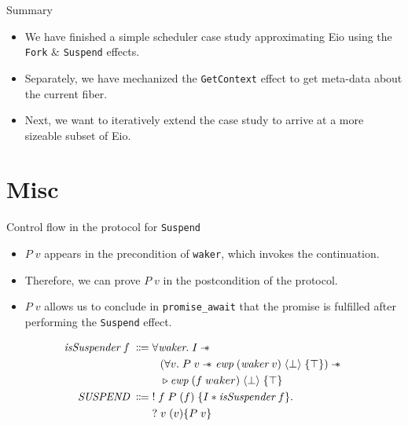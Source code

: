 \documentclass[aspectratio=43]{beamer}
\newcommand{\ocaml}[1]{\texttt{#1}}
\newcommand{\wand}{-\kern-.6em\raisebox{-.659ex}{*}\ }
\newcommand{\efork}{\ocaml{Fork}}
\newcommand{\esuspend}{\ocaml{Suspend}}
\newcommand{\egetctx}{\ocaml{GetContext}}
\begin{document}
\begin{frame}{Summary}
    \begin{itemize}
        \item We have finished a simple scheduler case study approximating Eio using the \efork{} \& \esuspend{} effects.
        \item Separately, we have mechanized the \egetctx{} effect to get meta-data about the current fiber.
        \item Next, we want to iteratively extend the case study to arrive at a more sizeable subset of Eio.
    \end{itemize}
\end{frame}

\section{Misc}

\begin{frame}[fragile]{Control flow in the protocol for \esuspend{}}
    \begin{itemize}
        \item \(P\; v\) appears in the precondition of \ocaml{waker}, which invokes the continuation.
        \item Therefore, we can prove \(P\; v\) in the postcondition of the protocol.
        \item \(P\; v\) allows us to conclude in \ocaml{promise_await} that the promise is fulfilled after performing the \esuspend{} effect.
    \end{itemize}
    \begin{align*}
        \textit{isSuspender}\; f\; \Coloneqq & \; \forall \textit{waker}.\; I \wand{}                                                                            \\
                                             & \quad (\forall v.\; P\; v \wand{} \textit{ewp}\; (\textit{waker}\; v)\; \langle \bot \rangle\; \{\top \}) \wand{} \\
                                             & \quad \triangleright \textit{ewp}\; (f\; waker)\; \langle \bot \rangle\; \{ \top \}                               \\
        \textit{SUSPEND}\;         \Coloneqq & \; !\; f\; P\; (f)\; \{ I \ast \textit{isSuspender}\; f \}.                                                       \\
                                             & \;?\; v\; (v) \{ P\; v \}
    \end{align*}
\end{frame}
\end{document}
